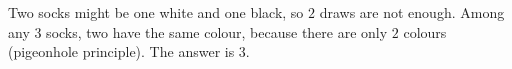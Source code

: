 Two socks might be one white and one black, so $2$ draws are not enough. Among any $3$ socks, two have the same colour, because there are only $2$ colours (pigeonhole principle). The answer is $\boxed{3}$.

